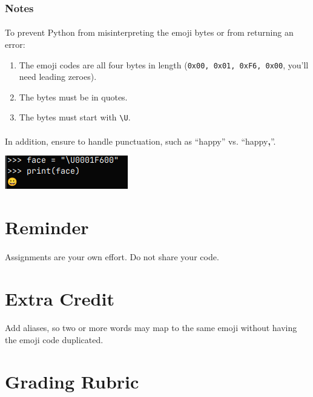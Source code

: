 \documentclass[letter,10pt]{article}
\begin{document}
    \subsubsection*{Notes}
    \paragraph{}To prevent Python from misinterpreting the emoji bytes or from returning an error:
    \begin{enumerate}
        \item The emoji codes are all four bytes in length (\texttt{0x00, 0x01, 0xF6, 0x00}, you'll need leading zeroes).
        \item The bytes must be in quotes.
        \item The bytes must start with \texttt{\textbackslash U}.
    \end{enumerate}
    \paragraph{}In addition, ensure to handle punctuation, such as ``happy'' vs. ``happy\textbf{,}''.
    
    \includegraphics{proj2_python_face}
    
    \section*{Reminder}
    \paragraph{}Assignments are your own effort. Do not share your code.
    
    \section*{Extra Credit}
    \paragraph{}Add aliases, so two or more words may map to the same emoji without having the emoji code duplicated.
    
    \section*{Grading Rubric}
\end{document}
